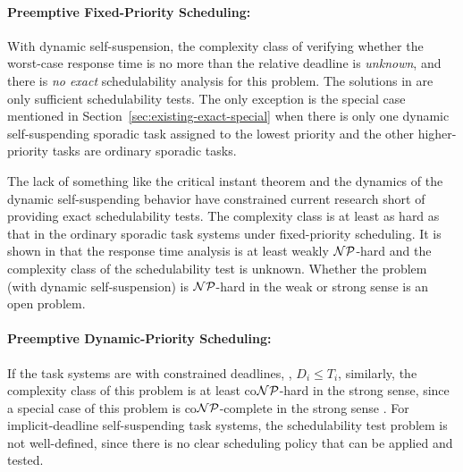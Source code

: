 \paragraph{Preemptive Fixed-Priority Scheduling:}   

With dynamic self-suspension, the complexity class of verifying whether the worst-case response time is no more than the relative deadline is \emph{unknown}, and there is \emph{no exact} schedulability analysis for this problem. The solutions in \cite{Liu:2000:RS:518501,LiuChen:rtss2014,huangpass:dac2015,ChenECRTS2016-suspension} are only sufficient schedulability tests. The only exception is the special case mentioned in Section~\ref{sec:existing-exact-special} when there is only one dynamic self-suspending sporadic task assigned to the lowest priority and the other higher-priority tasks are ordinary sporadic tasks. 


The lack of something like the critical instant theorem and the dynamics of the dynamic self-suspending behavior have constrained current research short of providing exact schedulability tests. The complexity class is at least as hard as that in the ordinary sporadic task systems under fixed-priority scheduling. It is shown in \cite{EisenbrandR08} that the response time analysis is at least weakly ${\cal NP}$-hard and the complexity class of the schedulability test is unknown. Whether the problem (with dynamic self-suspension) is ${\cal NP}$-hard in the weak or strong sense is an open problem.

\paragraph{Preemptive Dynamic-Priority Scheduling:} 
If the task systems are with constrained deadlines, \ie, $D_i \leq T_i$, similarly, the complexity class of this problem is at least co${\cal NP}$-hard in the strong sense, since a special case of this problem is co${\cal NP}$-complete in the strong sense \cite{DBLP:conf/ecrts/Ekberg015}. For implicit-deadline self-suspending task systems, the schedulability test problem is not well-defined, since there is no clear scheduling policy that can be applied and tested. 





  
